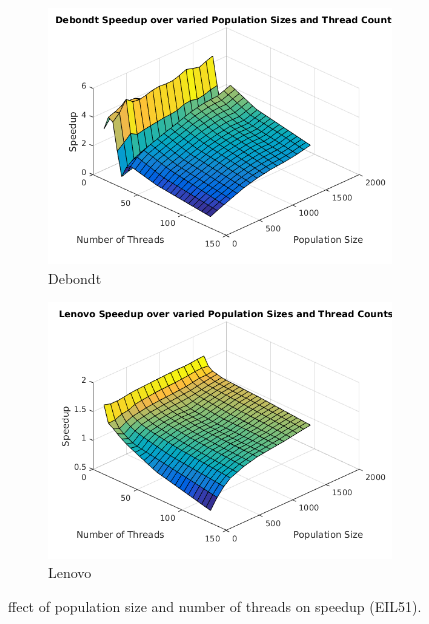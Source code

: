 \documentclass[10pt,letterpaper]{article}
\begin{document}
\begin{figure}[t]
\centering
  \begin{subfigure}{0.49\linewidth} \centering
	\includegraphics[width=\textwidth]{../img/Debondt_PopulationvsThreads.png}
    \caption{Debondt}\label{fig:figA}
  \end{subfigure}
  \begin{subfigure}{0.49\linewidth} \centering
	\includegraphics[width=\textwidth]{../img/Lenovo_PopulationvsThreads.png}        
    \caption{Lenovo}\label{fig:figB}
  \end{subfigure}
\caption{ffect of population size and number of threads on speedup (EIL51).} \label{fig:popvsthreads}
\end{figure}
\end{document}
